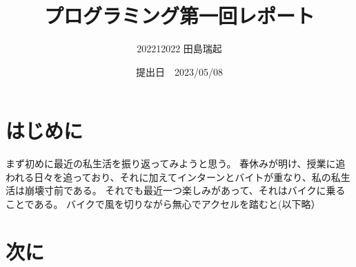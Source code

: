 \documentclass[fontsize=14pt,paper=a4]{jlreq}
\begin{document}
\title{プログラミング第一回レポート}
\author{202212022 田島瑞起}
\date{提出日　2023/05/08}
\maketitle
\newpage

\section{はじめに}
まず初めに最近の私生活を振り返ってみようと思う。
春休みが明け、授業に追われる日々を追っており、それに加えてインターンとバイトが重なり、私の私生活は崩壊寸前である。
それでも最近一つ楽しみがあって、それはバイクに乗ることである。
バイクで風を切りながら無心でアクセルを踏むと(以下略）
  
\section{次に}
  
\end{document}
